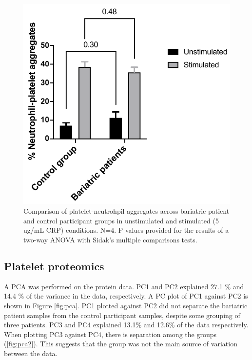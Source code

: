\documentclass[11pt,twoside]{bristolthesis}
\begin{document}
\begin{figure}
\includegraphics[width=0.8\linewidth]{figure/Bariatric_study/Plt-neu_aggregates} \caption[Comparison of platelet-neutrophil aggregates]{Comparison of platelet-neutrohpil aggregates across bariatric patient and control participant groups in unstimulated and stimulated (5 ug/mL CRP) conditions. N=4. P-values provided for the results of a two-way ANOVA with Sidak's multiple comparisons tests.}\label{fig:platelet-neutrophil}
\end{figure}
\hypertarget{platelet-proteomics}{%
\subsection{Platelet proteomics}\label{platelet-proteomics}}

A PCA was performed on the protein data. PC1 and PC2 explained 27.1 \% and 14.4 \% of the variance in the data, respectively. A PC plot of PC1 against PC2 is shown in Figure \ref{fig:pca}. PC1 plotted against PC2 did not separate the bariatric patient samples from the control participant samples, despite some grouping of three patients. PC3 and PC4 explained 13.1\% and 12.6\% of the data respectively. When plotting PC3 against PC4, there is separation among the groups (\ref{fig:pca2}). This suggests that the group was not the main source of variation between the data.
\end{document}
